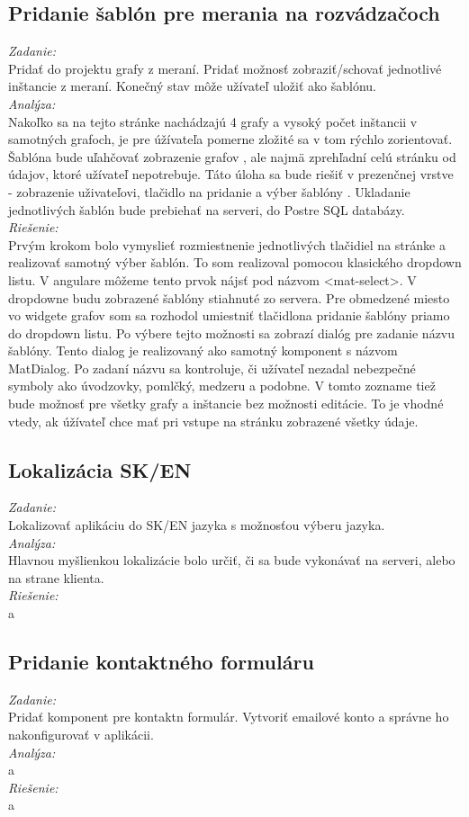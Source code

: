 \documentclass[11pt, oneside]{report}
\begin{document}
\subsection*{Pridanie šablón pre merania na rozvádzačoch }
\textit{Zadanie:}\\
Pridať do projektu grafy  z meraní. Pridať možnosť zobraziť/schovať jednotlivé inštancie  z meraní. Konečný stav môže užívateľ uložiť ako šablónu.
\\\textit{Analýza:}\\
 Nakoľko sa na tejto stránke nachádzajú 4 grafy  a vysoký počet inštancii v samotných grafoch, je pre úžívateľa pomerne zložité sa v tom rýchlo zorientovať. 
Šablóna bude uľahčovať zobrazenie grafov , ale najmä zprehľadní celú stránku od  údajov, ktoré užívateľ nepotrebuje. Táto úloha sa bude riešiť v prezenčnej vrstve - zobrazenie uživateľovi, tlačidlo na pridanie a výber šablóny . Ukladanie jednotlivých šablón bude prebiehať  na serveri, do Postre SQL databázy.
\\\textit{Riešenie:}\\
Prvým krokom bolo vymyslieť rozmiestnenie jednotlivých  tlačidiel na stránke a realizovať samotný výber šablón. To som realizoval pomocou klasického dropdown listu. V angulare môžeme tento  prvok nájsť pod názvom \textsf{<mat-select>}. V dropdowne budu zobrazené šablóny stiahnuté zo servera. Pre obmedzené miesto vo widgete grafov som sa rozhodol umiestniť tlačidlona pridanie šablóny priamo do dropdown listu. Po výbere tejto možnosti sa zobrazí dialóg pre zadanie názvu šablóny. Tento dialog je realizovaný ako samotný komponent s názvom  \textsf{MatDialog}. Po zadaní názvu sa kontroluje, či užívateľ nezadal nebezpečné symboly ako úvodzovky, pomlčký, medzeru  a podobne. V  tomto zozname tiež bude možnosť pre všetky grafy a inštancie bez možnosti editácie. To je vhodné vtedy, ak úžívateľ chce mať pri vstupe na stránku zobrazené všetky údaje. 
\subsection*{Lokalizácia SK/EN}
\textit{Zadanie:}\\
Lokalizovať aplikáciu do SK/EN jazyka s možnosťou výberu jazyka.
\\\textit{Analýza:}\\
Hlavnou myšlienkou lokalizácie bolo určiť, či sa bude vykonávať na serveri, alebo na strane klienta.
\\\textit{Riešenie:}\\
a
\subsection*{Pridanie kontaktného formuláru }
\textit{Zadanie:}\\
Pridať komponent pre kontaktn formulár. Vytvoriť emailové konto a správne ho nakonfigurovať v aplikácii.
\\\textit{Analýza:}\\
a
\\\textit{Riešenie:}\\
a
\end{document}
